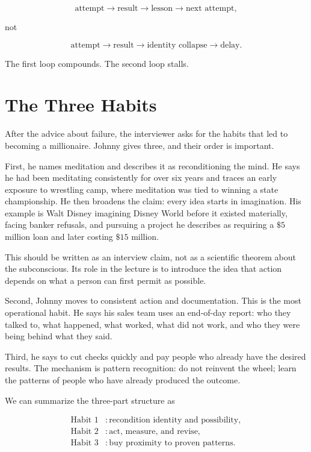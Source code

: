 \begin{equation}
\text{attempt}
\rightarrow
\text{result}
\rightarrow
\text{lesson}
\rightarrow
\text{next attempt},
\end{equation}

not

\begin{equation}
\text{attempt}
\rightarrow
\text{result}
\rightarrow
\text{identity collapse}
\rightarrow
\text{delay}.
\end{equation}

The first loop compounds. The second loop stalls.

\section{The Three Habits}

After the advice about failure, the interviewer asks for the habits that led to becoming a millionaire. Johnny gives three, and their order is important.

First, he names meditation and describes it as reconditioning the mind. He says he had been meditating consistently for over six years and traces an early exposure to wrestling camp, where meditation was tied to winning a state championship. He then broadens the claim: every idea starts in imagination. His example is Walt Disney imagining Disney World before it existed materially, facing banker refusals, and pursuing a project he describes as requiring a \( \$5 \) million loan and later costing \( \$15 \) million.

This should be written as an interview claim, not as a scientific theorem about the subconscious. Its role in the lecture is to introduce the idea that action depends on what a person can first permit as possible.

Second, Johnny moves to consistent action and documentation. This is the most operational habit. He says his sales team uses an end-of-day report: who they talked to, what happened, what worked, what did not work, and who they were being behind what they said.

Third, he says to cut checks quickly and pay people who already have the desired results. The mechanism is pattern recognition: do not reinvent the wheel; learn the patterns of people who have already produced the outcome.

We can summarize the three-part structure as

\begin{align}
\text{Habit 1} &: \text{recondition identity and possibility},\\
\text{Habit 2} &: \text{act, measure, and revise},\\
\text{Habit 3} &: \text{buy proximity to proven patterns}.
\end{align}

